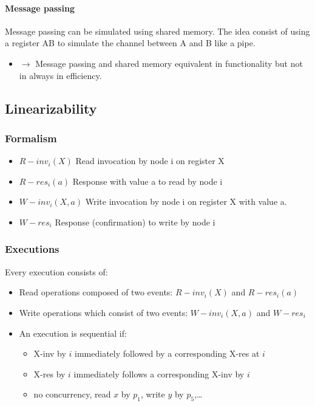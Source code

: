 \paragraph{Message passing}
Message passing can be simulated using shared memory. The idea
consist of using a register AB to simulate the channel between A and B like a pipe.

\begin{itemize}
    \item $\to$ Message passing and shared memory equivalent in functionality
but not in always in efficiency.
\end{itemize}

\subsection{Linearizability}
\subsubsection{Formalism}
\begin{itemize}
	\item $R-inv_i(X)$ Read invocation by node i on register X
	\item $R-res_i(a)$ Response with value a to read by node i
	\item $W-inv_i(X,a)$ Write invocation by node i on register
	X with value a.
	\item $W-res_i$ Response (confirmation) to write by node i
\end{itemize}

\subsubsection{Executions}
Every execution consists of:
\begin{itemize}
	\item Read operations composed of two events:
	$R-inv_i(X)$ and $R-res_i(a)$
	\item Write operations which consist of two events:
	$W-inv_i(X,a)$ and $W-res_i$
	\item An execution is sequential if:
	\begin{itemize}
		\item X-inv by $i$ immediately followed by a corresponding X-res at $i$
		\item X-res by $i$ immediately follows a corresponding X-inv by $i$
		\item no concurrency, read $x$ by $p_1$, write $y$ by $p_5$,\ldots
	\end{itemize}
\end{itemize}

